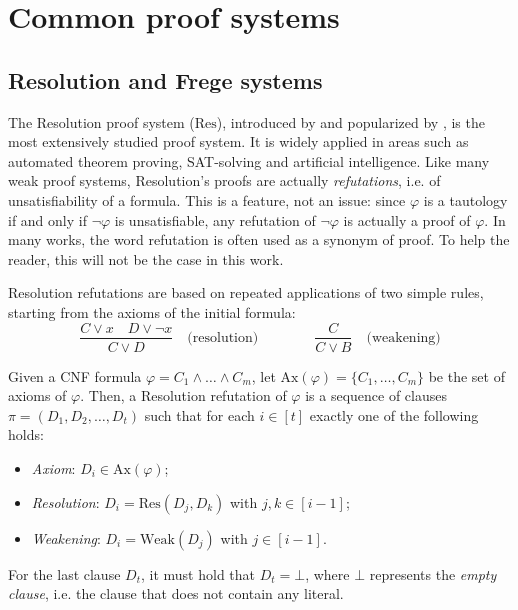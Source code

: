 \section{Common proof systems}
\label{sec:proof_systems}

\subsection{Resolution and Frege systems}

The Resolution proof system ($\mathrm{Res}$), introduced by \textcite{blake} and popularized by \textcite{robinson,davis_putnam}, is the most extensively studied proof system. It is widely applied in areas such as automated theorem proving, SAT-solving and artificial intelligence. Like many weak proof systems, Resolution's proofs are actually \textit{refutations}, i.e.  of unsatisfiability of a formula. This is a feature, not an issue: since $\varphi$ is a tautology if and only if $\lnot \varphi$ is unsatisfiable, any refutation of $\lnot \varphi$ is actually a proof of $\varphi$. In many works, the word refutation is often used as a synonym of proof. To help the reader, this will not be the case in this work.

Resolution refutations are based on repeated applications of two simple rules, starting from the axioms of the initial formula:
\[\dfrac{C \lor x \quad D \lor \lnot{x}}{C \lor D} \quad \text{(resolution)} \qquad\qquad \dfrac{C}{C \lor B} \quad \text{(weakening)}\]

Given a CNF formula $\varphi = C_1 \land \ldots \land C_m$, let $\mathrm{Ax}(\varphi) = \{C_1, \ldots, C_m\}$ be the set of axioms of $\varphi$. Then, a Resolution refutation of $\varphi$ is a sequence of clauses $\pi = (D_1, D_2, \ldots, D_t)$ such that for each $i \in [t]$ exactly one of the following holds:
\begin{itemize}
    \item \textit{Axiom}: $D_i \in \mathrm{Ax}(\varphi)$;
    \item \textit{Resolution}: $D_i = \mathrm{Res}(D_j, D_k)$ with $j,k \in [i-1]$;
    \item \textit{Weakening}: $D_i = \mathrm{Weak}(D_j)$ with $j \in [i-1]$.
\end{itemize}

For the last clause $D_t$, it must hold that $D_t = \bot$, where $\bot$ represents the \textit{empty clause}, i.e. the clause that does not contain any literal.

